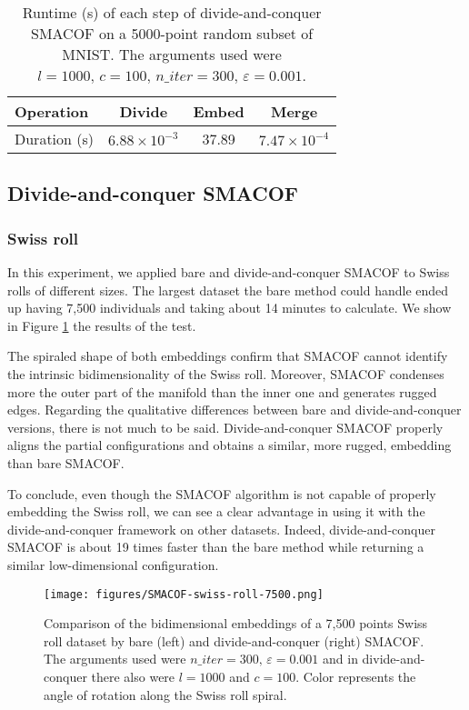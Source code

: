 \begin{table}
    \centering
    \caption{Runtime (s) of each step of divide-and-conquer SMACOF on a 5000-point random subset of MNIST. The arguments used were $l=1000,\, c=100,\, n\_iter = 300,\, \varepsilon = 0.001$.}
    \begin{tabular}{lccc}
        \toprule
        Operation    & Divide & Embed & Merge \\
        \midrule
        Duration (s) & $6.88 \times 10^{-3}$ & 37.89 & $7.47 \times 10^{-4}$ \\
        \bottomrule
    \end{tabular}
    \label{tab:dc-overhead}
\end{table}

\subsection{Divide-and-conquer SMACOF}
\label{sec:dc-SMACOF}

\subsubsection{Swiss roll}
\label{sec:dc-SMACOF-swiss-roll}

In this experiment, we applied bare and divide-and-conquer SMACOF to Swiss rolls of different sizes. The largest dataset the bare method could handle ended up having 7,500 individuals and taking about 14 minutes to calculate. We show in Figure \ref{fig:SMACOF-swiss-roll-7500} the results of the test.

The spiraled shape of both embeddings confirm that SMACOF cannot identify the intrinsic bidimensionality of the Swiss roll. Moreover, SMACOF condenses more the outer part of the manifold than the inner one and generates rugged edges. Regarding the qualitative differences between bare and divide-and-conquer versions, there is not much to be said. Divide-and-conquer SMACOF properly aligns the partial configurations and obtains a similar, more rugged, embedding than bare SMACOF.

To conclude, even though the SMACOF algorithm is not capable of properly embedding the Swiss roll, we can see a clear advantage in using it with the divide-and-conquer framework on other datasets. Indeed, divide-and-conquer SMACOF is about 19 times faster than the bare method while returning a similar low-dimensional configuration.

\begin{figure}
    \centering
    \texttt{[image: figures/SMACOF-swiss-roll-7500.png]}
    \caption{Comparison of the bidimensional embeddings of a 7,500 points Swiss roll dataset by bare (left) and divide-and-conquer (right) SMACOF. The arguments used were $n\_iter = 300,\, \varepsilon = 0.001$ and in divide-and-conquer there also were $l=1000$ and $c=100$. Color represents the angle of rotation along the Swiss roll spiral.}
    \label{fig:SMACOF-swiss-roll-7500}
\end{figure}



